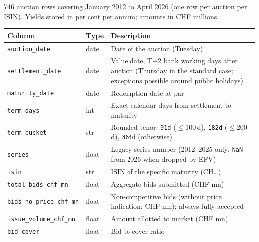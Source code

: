 \documentclass[12pt,a4paper]{article}
\begin{document}
746 auction rows covering January 2012 to April 2026 (one row per auction per
ISIN).  Yields stored in per cent per annum; amounts in CHF millions.

\begin{longtable}{L{4.0cm} L{2.3cm} L{7.5cm}}
  \toprule
  \textbf{Column} & \textbf{Type} & \textbf{Description} \\
  \midrule
  \endhead
  \bottomrule
  \endfoot
  \texttt{auction\_date}         & date  & Date of the auction (Tuesday) \\[3pt]
  \texttt{settlement\_date}      & date  & Value date, T+2 bank working days
                                           after auction (Thursday in the
                                           standard case; exceptions possible
                                           around public holidays) \\[3pt]
  \texttt{maturity\_date}        & date  & Redemption date at par \\[3pt]
  \texttt{term\_days}            & int   & Exact calendar days from settlement
                                           to maturity \\[3pt]
  \texttt{term\_bucket}          & str   & Rounded tenor: \texttt{91d}
                                           ($\leq$100\,d), \texttt{182d}
                                           ($\leq$200\,d), \texttt{364d}
                                           (otherwise) \\[3pt]
  \texttt{series}                & float & Legacy series number (2012--2025
                                           only; \texttt{NaN} from 2026
                                           when dropped by EFV) \\[3pt]
  \texttt{isin}                  & str   & ISIN of the specific maturity
                                           (CH\ldots) \\[3pt]
  \texttt{total\_bids\_chf\_mn}  & float & Aggregate bids submitted
                                           (CHF mn) \\[3pt]
  \texttt{bids\_no\_price\_chf\_mn} & float & Non-competitive bids (without
                                           price indication; CHF mn);
                                           always fully accepted \\[3pt]
  \texttt{issue\_volume\_chf\_mn}& float & Amount allotted to market
                                           (CHF mn) \\[3pt]
  \texttt{bid\_cover}            & float & Bid-to-cover ratio

\end{longtable}
\end{document}
